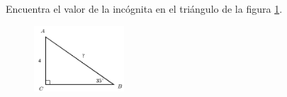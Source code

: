 \question[15]  Encuentra el valor de la incógnita en el triángulo de la figura \ref{fig:lados_functrig_06}.
\begin{figure}[H]
    \begin{center}
        \includegraphics[width=0.3\textwidth]{../images/lados_functrig_06.png}
    \end{center}
    \caption{}
    \label{fig:lados_functrig_06}
\end{figure}